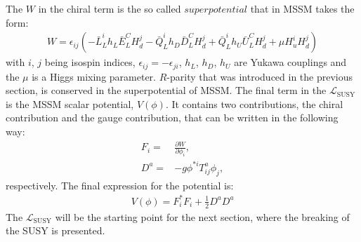 The $W$ in the chiral term is the so called $superpotential$ that in MSSM takes the form:
\begin{align} 
W=\epsilon_{ij}(-\bar{L}_{L}^{i}h_{L}\bar{E}_{L}^{C}H_{d}^{j}-\bar{Q}_{L}^{i}h_{D}\bar{D}_{L}^{C}H_{d}^{j}+\bar{Q}_{L}^{i}h_{U}\bar{U}_{L}^{C}H_{d}^{j}+\mu H_{u}^{i}H_{d}^{j})
\end{align}
with $i$, $j$ being isospin indices, $\epsilon_{ij}=-\epsilon_{ji}$, $h_{L}$, $h_{D}$, $h_{U}$ are Yukawa couplings and the $\mu$ is a Higgs mixing parameter.
$R$-parity that was introduced in the previous section, is conserved in the superpotential of MSSM. 
The final term in the $\mathcal{L}_{\mathrm{SUSY}}$ is the MSSM scalar potential, $V(\phi)$. 
It contains two contributions, the chiral contribution and the gauge contribution, that can be written in the following way:
\begin{align}
F_{i}=&\frac{\partial W}{\partial \phi_{i}},\\
D^{a}=&-g\phi^{*i}T_{ij}^{a}\phi_{j},
\end{align}
respectively. The final expression for the potential is:
\begin{align}
V(\phi)=F_{i}^{*}F_{i}+\frac{1}{2}D^{a}D^{a}
\end{align}
The $\mathcal{L}_{\mathrm{SUSY}}$ will be the starting point for the next section, where the breaking of the SUSY is presented. 
